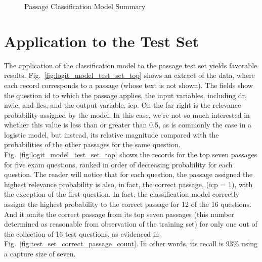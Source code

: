 \begin{figure}
\centering
\vspace{1.0in}
\caption{Passage Classification Model Summary}
\label{fig:logistic_model_summary}
\end{figure}


\section{Application to the Test Set}

The application of the classification model to the passage test set yields favorable results.  Fig.~\ref{fig:logit_model_test_set_top} shows an extract of the data, where each record corresponds to a passage (whose text is not shown).  The fields show the question id to which the passage applies, the input variables, including dr, nwic, and llcs, and the output variable, icp.  On the far right is the relevance probability assigned by the model.  In this case, we're not so much interested in whether this value is less than or greater than 0.5, as is commonly the case in a logistic model, but instead, its relative magnitude compared with the probabilities of the other passages for the same question.  Fig.~\ref{fig:logit_model_test_set_top} shows the records for the top seven passages for five exam questions, ranked in order of decreasing probability for each question.  The reader will notice that for each question, the passage assigned the highest relevance probability is also, in fact, the correct passage, (icp = 1), with the exception of the first question.  In fact, the classification model correctly assigns the highest probability to the correct passage for 12 of the 16 questions.  And it omits the correct passage from its top seven passages (this number determined as reasonable from observation of the training set) for only one out of the collection of 16 test questions, as evidenced in Fig.~\ref{fig:test_set_correct_passage_count}.  In other words, its recall is 93\% using a capture size of seven.


